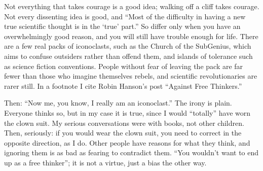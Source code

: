 Not everything that takes courage is a good idea; walking off a cliff takes courage. Not every dissenting idea is good, and ``Most of the difficulty in having a new true scientific thought is in the `true' part.'' So differ only when you have an overwhelmingly good reason, and you will still have trouble enough for life. There are a few real packs of iconoclasts, such as the Church of the SubGenius, which aims to confuse outsiders rather than offend them, and islands of tolerance such as science fiction conventions. People without fear of leaving the pack are far fewer than those who imagine themselves rebels, and scientific revolutionaries are rarer still. In a footnote I cite Robin Hanson's post ``Against Free Thinkers.'' 

Then: ``Now me, you know, I really am an iconoclast.'' The irony is plain. Everyone thinks so, but in my case it is true, since I would ``totally'' have worn the clown suit. My serious conversations were with books, not other children. Then, seriously: if you would wear the clown suit, you need to correct in the opposite direction, as I do. Other people have reasons for what they think, and ignoring them is as bad as fearing to contradict them. ``You wouldn't want to end up as a free thinker''; it is not a virtue, just a bias the other way.
